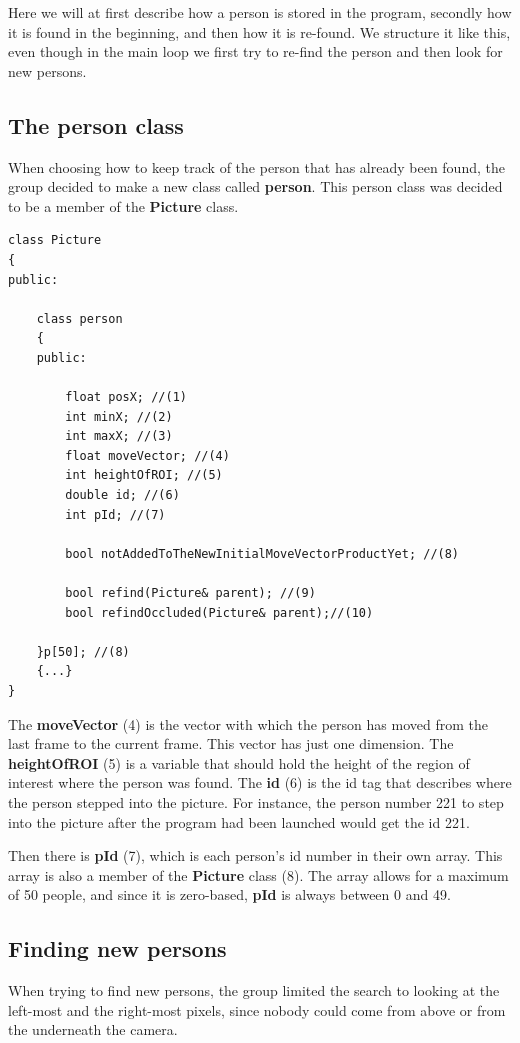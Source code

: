 Here we will at first describe how a person is stored in the program, secondly how it is found in the beginning, and then how it is re-found. We structure it like this, even though in the main loop we first try to re-find the person and then look for new persons.

\subsection{The person class}
When choosing how to keep track of the person that has already been found, the group decided to make a new class called \textbf{person}. This person class was decided to be a member of the \textbf{Picture} class. 
\begin{lstlisting}
class Picture
{
public:
	
	class person
	{
	public:

		float posX; //(1)
		int minX; //(2)
		int maxX; //(3)
		float moveVector; //(4)
		int heightOfROI; //(5)
		double id; //(6)
		int pId; //(7)

		bool notAddedToTheNewInitialMoveVectorProductYet; //(8)

		bool refind(Picture& parent); //(9)
		bool refindOccluded(Picture& parent);//(10)

	}p[50]; //(8)
	{...}
}
\end{lstlisting}
The \textbf{moveVector} (4) is the vector with which the person has moved from the last frame to the current frame. This vector has just one dimension. The \textbf{heightOfROI} (5) is a variable that should hold the height of the region of interest where the person was found. The \textbf{id} (6) is the id tag that describes where the person stepped into the picture. For instance, the person number 221 to step into the picture after the program had been launched would get the id 221.

Then there is \textbf{pId} (7), which is each person's id number in their own array. This array is also a member of the \textbf{Picture} class (8). The array allows for a maximum of 50 people, and since it is zero-based, \textbf{pId} is always between 0 and 49.

\subsection{Finding new persons}\label{findPerson}
When trying to find new persons, the group limited the search to looking at the left-most and the right-most pixels, since nobody could come from above or from the underneath the camera.

